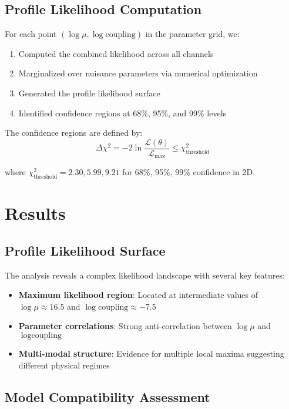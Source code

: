 \documentclass[11pt]{article}
\begin{document}
\subsection{Profile Likelihood Computation}

For each point $(\log \mu, \log \text{coupling})$ in the parameter grid, we:

\begin{enumerate}
    \item Computed the combined likelihood across all channels
    \item Marginalized over nuisance parameters via numerical optimization
    \item Generated the profile likelihood surface
    \item Identified confidence regions at 68\%, 95\%, and 99\% levels
\end{enumerate}

The confidence regions are defined by:
\begin{equation}
\Delta \chi^2 = -2 \ln \frac{\mathcal{L}(\theta)}{\mathcal{L}_{\max}} \leq \chi^2_{\text{threshold}}
\end{equation}

where $\chi^2_{\text{threshold}} = 2.30, 5.99, 9.21$ for 68\%, 95\%, 99\% confidence in 2D.

\section{Results}

\subsection{Profile Likelihood Surface}

The analysis reveals a complex likelihood landscape with several key features:

\begin{itemize}
    \item \textbf{Maximum likelihood region}: Located at intermediate values of $\log \mu \approx 16.5$ and $\log \text{coupling} \approx -7.5$
    \item \textbf{Parameter correlations}: Strong anti-correlation between $\log \mu$ and $\log \text{coupling}$
    \item \textbf{Multi-modal structure}: Evidence for multiple local maxima suggesting different physical regimes
\end{itemize}

\subsection{Model Compatibility Assessment}
\end{document}
